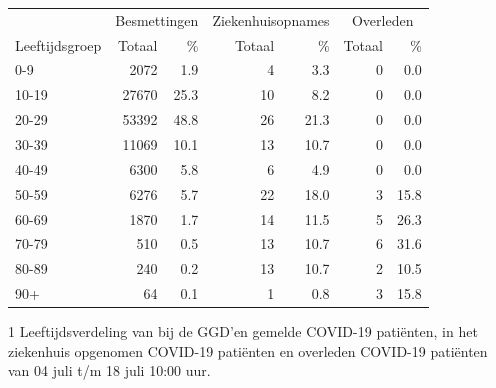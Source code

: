 \documentclass[
  english,
  man,floatsintext]{apa6}
\begin{document}
\begin{table}
\centering\begingroup\fontsize{11}{13}\selectfont

\begin{threeparttable}
\begin{tabular}{lrrrrrr}
\toprule
\multicolumn{1}{c}{ } & \multicolumn{2}{c}{Besmettingen} & \multicolumn{2}{c}{Ziekenhuisopnames} & \multicolumn{2}{c}{Overleden} \\
\cmidrule(l{3pt}r{3pt}){2-3} \cmidrule(l{3pt}r{3pt}){4-5} \cmidrule(l{3pt}r{3pt}){6-7}
Leeftijdsgroep & Totaal & \% & Totaal & \% & Totaal & \%\\
\midrule
0-9 & 2072 & 1.9 & 4 & 3.3 & 0 & 0.0\\
10-19 & 27670 & 25.3 & 10 & 8.2 & 0 & 0.0\\
20-29 & 53392 & 48.8 & 26 & 21.3 & 0 & 0.0\\
30-39 & 11069 & 10.1 & 13 & 10.7 & 0 & 0.0\\
40-49 & 6300 & 5.8 & 6 & 4.9 & 0 & 0.0\\
50-59 & 6276 & 5.7 & 22 & 18.0 & 3 & 15.8\\
60-69 & 1870 & 1.7 & 14 & 11.5 & 5 & 26.3\\
70-79 & 510 & 0.5 & 13 & 10.7 & 6 & 31.6\\
80-89 & 240 & 0.2 & 13 & 10.7 & 2 & 10.5\\
90+ & 64 & 0.1 & 1 & 0.8 & 3 & 15.8\\
\bottomrule
\end{tabular}
\begin{tablenotes}
\item[1] Leeftijdsverdeling van bij de GGD’en gemelde COVID-19 patiënten, in het ziekenhuis opgenomen COVID-19 patiënten en overleden COVID-19 patiënten van 04 juli t/m 18 juli 10:00 uur.
\end{tablenotes}
\end{threeparttable}
\endgroup{}
\end{table}

\newpage
\end{document}
